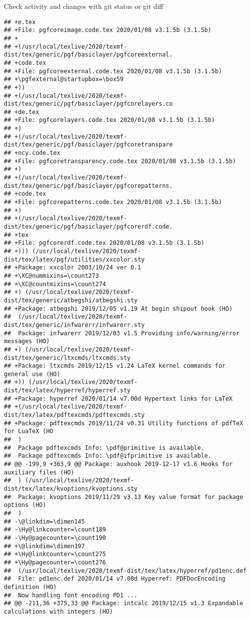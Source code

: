 \documentclass[ignorenonframetext,]{beamer}
\begin{document}
\begin{frame}[fragile]{Check activity and changes with git status or git
diff}
\begin{verbatim}
## +e.tex
## +File: pgfcoreimage.code.tex 2020/01/08 v3.1.5b (3.1.5b)
## +
## +(/usr/local/texlive/2020/texmf-dist/tex/generic/pgf/basiclayer/pgfcoreexternal.
## +code.tex
## +File: pgfcoreexternal.code.tex 2020/01/08 v3.1.5b (3.1.5b)
## +\pgfexternal@startupbox=\box59
## +))
## +(/usr/local/texlive/2020/texmf-dist/tex/generic/pgf/basiclayer/pgfcorelayers.co
## +de.tex
## +File: pgfcorelayers.code.tex 2020/01/08 v3.1.5b (3.1.5b)
## +)
## +(/usr/local/texlive/2020/texmf-dist/tex/generic/pgf/basiclayer/pgfcoretranspare
## +ncy.code.tex
## +File: pgfcoretransparency.code.tex 2020/01/08 v3.1.5b (3.1.5b)
## +)
## +(/usr/local/texlive/2020/texmf-dist/tex/generic/pgf/basiclayer/pgfcorepatterns.
## +code.tex
## +File: pgfcorepatterns.code.tex 2020/01/08 v3.1.5b (3.1.5b)
## +)
## +(/usr/local/texlive/2020/texmf-dist/tex/generic/pgf/basiclayer/pgfcorerdf.code.
## +tex
## +File: pgfcorerdf.code.tex 2020/01/08 v3.1.5b (3.1.5b)
## +))) (/usr/local/texlive/2020/texmf-dist/tex/latex/pgf/utilities/xxcolor.sty
## +Package: xxcolor 2003/10/24 ver 0.1
## +\XC@nummixins=\count273
## +\XC@countmixins=\count274
## +) (/usr/local/texlive/2020/texmf-dist/tex/generic/atbegshi/atbegshi.sty
## +Package: atbegshi 2019/12/05 v1.19 At begin shipout hook (HO)
##  (/usr/local/texlive/2020/texmf-dist/tex/generic/infwarerr/infwarerr.sty
##  Package: infwarerr 2019/12/03 v1.5 Providing info/warning/error messages (HO)
## +) (/usr/local/texlive/2020/texmf-dist/tex/generic/ltxcmds/ltxcmds.sty
## +Package: ltxcmds 2019/12/15 v1.24 LaTeX kernel commands for general use (HO)
## +)) (/usr/local/texlive/2020/texmf-dist/tex/latex/hyperref/hyperref.sty
## +Package: hyperref 2020/01/14 v7.00d Hypertext links for LaTeX
## +(/usr/local/texlive/2020/texmf-dist/tex/latex/pdftexcmds/pdftexcmds.sty
## +Package: pdftexcmds 2019/11/24 v0.31 Utility functions of pdfTeX for LuaTeX (HO
##  )
##  Package pdftexcmds Info: \pdf@primitive is available.
##  Package pdftexcmds Info: \pdf@ifprimitive is available.
## @@ -199,9 +363,9 @@ Package: auxhook 2019-12-17 v1.6 Hooks for auxiliary files (HO)
##  ) (/usr/local/texlive/2020/texmf-dist/tex/latex/kvoptions/kvoptions.sty
##  Package: kvoptions 2019/11/29 v3.13 Key value format for package options (HO)
##  )
## -\@linkdim=\dimen145
## -\Hy@linkcounter=\count189
## -\Hy@pagecounter=\count190
## +\@linkdim=\dimen197
## +\Hy@linkcounter=\count275
## +\Hy@pagecounter=\count276
##  (/usr/local/texlive/2020/texmf-dist/tex/latex/hyperref/pd1enc.def
##  File: pd1enc.def 2020/01/14 v7.00d Hyperref: PDFDocEncoding definition (HO)
##  Now handling font encoding PD1 ...
## @@ -211,36 +375,33 @@ Package: intcalc 2019/12/15 v1.3 Expandable calculations with integers (HO)

\end{verbatim}
\end{frame}
\end{document}
